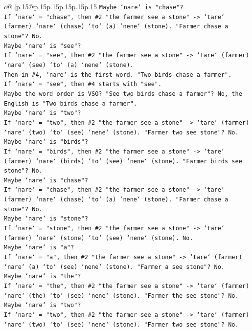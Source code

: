 \documentclass{article}
\begin{document}
{\begin{supertabular}{c@{$\;$}|p{.15\linewidth}@{}p{.15\linewidth}p{.15\linewidth}p{.15\linewidth}p{.15\linewidth}p{.15\linewidth}}
{{{\texttt{Maybe `nare` is "chase"?} \\
\texttt{If `nare` = "chase", then \#2 "the farmer see a stone" {-}> `tare` (farmer) `nare` (chase) `to` (a) `nene` (stone). "Farmer chase a stone"? No.} \\
\texttt{Maybe `nare` is "see"?} \\
\texttt{If `nare` = "see", then \#2 "the farmer see a stone" {-}> `tare` (farmer) `nare` (see) `to` (a) `nene` (stone).} \\
\texttt{Then in \#4, `nare` is the first word. "Two birds chase a farmer".} \\
\texttt{If `nare` = "see", then \#4 starts with "see".} \\
\texttt{Maybe the word order is VSO? "See two birds chase a farmer"? No, the English is "Two birds chase a farmer".} \\
\texttt{Maybe `nare` is "two"?} \\
\texttt{If `nare` = "two", then \#2 "the farmer see a stone" {-}> `tare` (farmer) `nare` (two) `to` (see) `nene` (stone). "Farmer two see stone"? No.} \\
\texttt{Maybe `nare` is "birds"?} \\
\texttt{If `nare` = "birds", then \#2 "the farmer see a stone" {-}> `tare` (farmer) `nare` (birds) `to` (see) `nene` (stone). "Farmer birds see stone"? No.} \\
\texttt{Maybe `nare` is "chase"?} \\
\texttt{If `nare` = "chase", then \#2 "the farmer see a stone" {-}> `tare` (farmer) `nare` (chase) `to` (a) `nene` (stone). "Farmer chase a stone"? No.} \\
\texttt{Maybe `nare` is "stone"?} \\
\texttt{If `nare` = "stone", then \#2 "the farmer see a stone" {-}> `tare` (farmer) `nare` (stone) `to` (see) `nene` (stone). No.} \\
\texttt{Maybe `nare` is "a"?} \\
\texttt{If `nare` = "a", then \#2 "the farmer see a stone" {-}> `tare` (farmer) `nare` (a) `to` (see) `nene` (stone). "Farmer a see stone"? No.} \\
\texttt{Maybe `nare` is "the"?} \\
\texttt{If `nare` = "the", then \#2 "the farmer see a stone" {-}> `tare` (farmer) `nare` (the) `to` (see) `nene` (stone). "Farmer the see stone"? No.} \\
\texttt{Maybe `nare` is "two"?} \\
\texttt{If `nare` = "two", then \#2 "the farmer see a stone" {-}> `tare` (farmer) `nare` (two) `to` (see) `nene` (stone). "Farmer two see stone"? No.} \\
}}}
\end{supertabular}}
\end{document}
